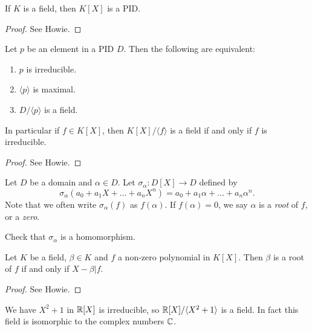 \begin{theorem}
  If $K$ is a field, then $K[X]$ is a PID.
\end{theorem}

\begin{proof}
  See Howie.
\end{proof}

\begin{theorem}
  Let $p$ be an element in a PID $D$. Then the
  following are equivalent:
  \begin{enumerate}
    \item $p$ is irreducible.
    \item $\langle p \rangle$ is maximal.
    \item $D / \langle p \rangle$ is a field.
  \end{enumerate}
  In particular if $f \in K[X]$, then
  $K[X] / \langle f \rangle$ is a field if and only if $f$ is irreducible.
\end{theorem}

\begin{proof}
  See Howie.
\end{proof}

\begin{definition}
  Let $D$ be a domain and $\alpha \in D$.
  Let $\sigma_{\alpha} : D[X] \to D$ defined by
  \[
    \sigma_{\alpha} (a_0 + a_1 X + \dots + a_n X^n) = a_0 + a_1 \alpha + \dots + a_n \alpha^n.
  \]
  Note that we often write $\sigma_{\alpha} (f)$ as
  $f(\alpha)$. If $f(\alpha) = 0$, we say
  $\alpha$ is a \emph{root} of $f$, or a \emph{zero}.
\end{definition}

\begin{exercise}
  Check that $\sigma_{\alpha}$ is a homomorphism.
\end{exercise}

\begin{theorem}
  Let $K$ be a field, $\beta \in K$ and $f$ a non-zero
  polynomial in $K[X]$. Then $\beta$ is a root of $f$
  if and only if $X - \beta | f$.
\end{theorem}

\begin{proof}
  See Howie.
\end{proof}

\begin{example}
  We have $X^2 + 1$ in $\mathbb{R}[X]$ is irreducible,
  so $\mathbb{R}[X] / \langle X^2 + 1 \rangle$ is a field.
  In fact this field is isomorphic to the complex
  numbers $\mathbb{C}$.
\end{example}

